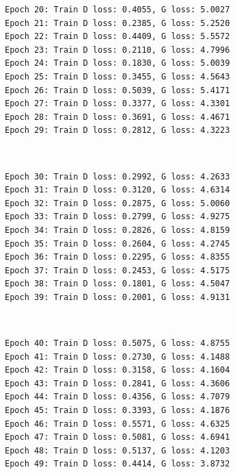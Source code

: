 \documentclass[11pt]{article}
\begin{document}
    \begin{Verbatim}[commandchars=\\\{\}]
Epoch 20: Train D loss: 0.4055, G loss: 5.0027
Epoch 21: Train D loss: 0.2385, G loss: 5.2520
Epoch 22: Train D loss: 0.4409, G loss: 5.5572
Epoch 23: Train D loss: 0.2110, G loss: 4.7996
Epoch 24: Train D loss: 0.1830, G loss: 5.0039
Epoch 25: Train D loss: 0.3455, G loss: 4.5643
Epoch 26: Train D loss: 0.5039, G loss: 5.4171
Epoch 27: Train D loss: 0.3377, G loss: 4.3301
Epoch 28: Train D loss: 0.3691, G loss: 4.4671
Epoch 29: Train D loss: 0.2812, G loss: 4.3223

    \end{Verbatim}

    \begin{center}
    \end{center}
    { \hspace*{\fill} \\}
    
    \begin{Verbatim}[commandchars=\\\{\}]
Epoch 30: Train D loss: 0.2992, G loss: 4.2633
Epoch 31: Train D loss: 0.3120, G loss: 4.6314
Epoch 32: Train D loss: 0.2875, G loss: 5.0060
Epoch 33: Train D loss: 0.2799, G loss: 4.9275
Epoch 34: Train D loss: 0.2826, G loss: 4.8159
Epoch 35: Train D loss: 0.2604, G loss: 4.2745
Epoch 36: Train D loss: 0.2295, G loss: 4.8355
Epoch 37: Train D loss: 0.2453, G loss: 4.5175
Epoch 38: Train D loss: 0.1801, G loss: 4.5047
Epoch 39: Train D loss: 0.2001, G loss: 4.9131

    \end{Verbatim}

    \begin{center}
    \end{center}
    { \hspace*{\fill} \\}
    
    \begin{Verbatim}[commandchars=\\\{\}]
Epoch 40: Train D loss: 0.5075, G loss: 4.8755
Epoch 41: Train D loss: 0.2730, G loss: 4.1488
Epoch 42: Train D loss: 0.3158, G loss: 4.1604
Epoch 43: Train D loss: 0.2841, G loss: 4.3606
Epoch 44: Train D loss: 0.4356, G loss: 4.7079
Epoch 45: Train D loss: 0.3393, G loss: 4.1876
Epoch 46: Train D loss: 0.5571, G loss: 4.6325
Epoch 47: Train D loss: 0.5081, G loss: 4.6941
Epoch 48: Train D loss: 0.5137, G loss: 4.1203
Epoch 49: Train D loss: 0.4414, G loss: 3.8732

    \end{Verbatim}
\end{document}
